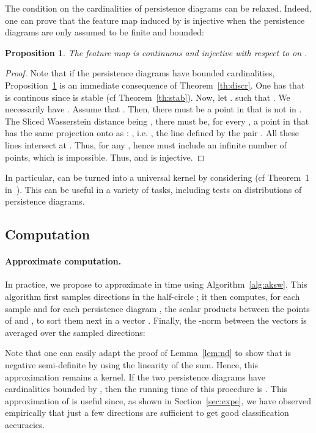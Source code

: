 \documentclass[11pt]{article}
\newtheorem{prop}[thm]{Proposition}
\begin{document}
The condition on the cardinalities of persistence diagrams can be relaxed. Indeed, one can prove that the feature map  induced by  
is injective when the persistence diagrams are only assumed to be finite and bounded:

\begin{prop}\label{prop:inj}
The feature map  is continuous and injective with respect to  on .
\end{prop}	

\begin{proof}
Note that if the persistence diagrams have bounded cardinalities, Proposition~\ref{prop:inj} is an immediate consequence of Theorem~\ref{th:discr}.
One has that  is continous since  is stable (cf Theorem~\ref{th:stab}).
Now, let . such that  . 
We necessarily have .
Assume that . 
Then, there must be a point  in  that is not in .
The Sliced Wasserstein distance being , there must be, for every , a point  in  
that has the same projection onto  as : , i.e. 
, the line defined by the pair . 
All these lines  intersect at .
Thus,  for any , hence 
must include an infinite number of points,
which is impossible. Thus,  and  is injective. 

\end{proof}

In particular,  can be turned into a universal kernel by considering   (cf Theorem~1 in~\cite{Kwitt15}).
This can be useful in a variety of tasks, including tests on distributions of persistence diagrams.


\subsection{Computation}\label{sec:comput}

\paragraph*{Approximate computation.} In practice, we propose to approximate  in 
time using Algorithm~\ref{alg:aksw}. This algorithm first samples  directions
in the half-circle ; it then computes, for
each sample  and for each persistence diagram , the scalar
products between the points of  and , to sort them next in a
vector . Finally, the -norm between the vectors 
is averaged over the sampled directions:

Note that one can easily adapt the proof of Lemma~\ref{lem:nd} to show that  
is negative semi-definite
by using the linearity of the sum. Hence, this approximation remains a kernel.
If the two persistence diagrams have cardinalities bounded by ,
then the running time of this procedure is . 
This approximation of   is useful since, as shown in
Section~\ref{sec:expe}, we have observed empirically that just a few directions are sufficient to get good classification accuracies.
\end{document}
